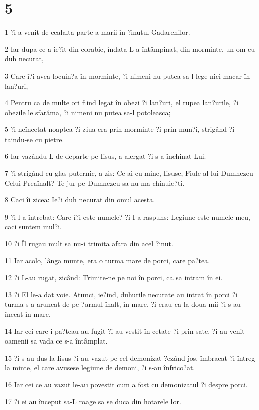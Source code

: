 \chapter{5}

\par 1 ?i a venit de cealalta parte a marii în ?inutul Gadarenilor.
\par 2 Iar dupa ce a ie?it din corabie, îndata L-a întâmpinat, din morminte, un om cu duh necurat,
\par 3 Care î?i avea locuin?a în morminte, ?i nimeni nu putea sa-l lege nici macar în lan?uri,
\par 4 Pentru ca de multe ori fiind legat în obezi ?i lan?uri, el rupea lan?urile, ?i obezile le sfarâma, ?i nimeni nu putea sa-l potoleasca;
\par 5 ?i neîncetat noaptea ?i ziua era prin morminte ?i prin mun?i, strigând ?i taindu-se cu pietre.
\par 6 Iar vazându-L de departe pe Iisus, a alergat ?i s-a închinat Lui.
\par 7 ?i strigând cu glas puternic, a zis: Ce ai cu mine, Iisuse, Fiule al lui Dumnezeu Celui Preaînalt? Te jur pe Dumnezeu sa nu ma chinuie?ti.
\par 8 Caci îi zicea: Ie?i duh necurat din omul acesta.
\par 9 ?i l-a întrebat: Care î?i este numele? ?i I-a raspuns: Legiune este numele meu, caci suntem mul?i.
\par 10 ?i Îl rugau mult sa nu-i trimita afara din acel ?inut.
\par 11 Iar acolo, lânga munte, era o turma mare de porci, care pa?tea.
\par 12 ?i L-au rugat, zicând: Trimite-ne pe noi în porci, ca sa intram în ei.
\par 13 ?i El le-a dat voie. Atunci, ie?ind, duhurile necurate au intrat în porci ?i turma s-a aruncat de pe ?armul înalt, în mare. ?i erau ca la doua mii ?i s-au înecat în mare.
\par 14 Iar cei care-i pa?teau au fugit ?i au vestit în cetate ?i prin sate. ?i au venit oamenii sa vada ce s-a întâmplat.
\par 15 ?i s-au dus la Iisus ?i au vazut pe cel demonizat ?ezând jos, îmbracat ?i întreg la minte, el care avusese legiune de demoni, ?i s-au înfrico?at.
\par 16 Iar cei ce au vazut le-au povestit cum a fost cu demonizatul ?i despre porci.
\par 17 ?i ei au început sa-L roage sa se duca din hotarele lor.
